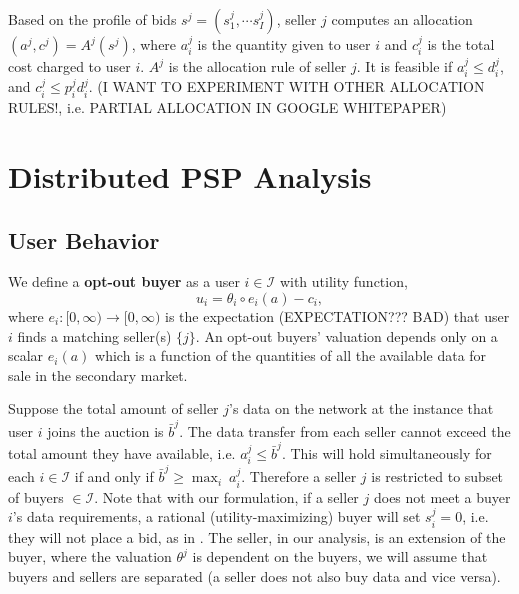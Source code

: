 \documentclass[12pt]{article}
\theoremstyle{definition}
\newcommand{\mcI}{\mathcal{I}}
\begin{document}
\begin{multicols}{2}
Based on the profile of bids $s^j = (s^j_1, \cdots s^j_I)$, seller $j$ computes
an allocation $(a^j, c^j) = A^j(s^j)$, where $a^j_i$ is the quantity given to
user $i$ and $c^j_i$ is the total cost charged to user $i$. $A^j$ is the
allocation rule of seller $j$. It is feasible if $a^j_i \le d_i^j$, and $c^j_i \le  p^j_i d_i^j$.
(I WANT TO EXPERIMENT WITH OTHER ALLOCATION RULES!, i.e. PARTIAL ALLOCATION IN
GOOGLE WHITEPAPER)

\section{Distributed PSP Analysis}
\subsection{User Behavior}

We define a \textbf{opt-out buyer} as a user $i\in\mcI$ with utility
function,
\begin{equation}\label{opt-utility}
    u_i = \theta_i \circ e_i(a) - c_i,
\end{equation}
where $e_i : [0, \infty) \rightarrow [0,\infty)$ is the expectation 
(EXPECTATION??? BAD) that user
$i$ finds a matching seller(s) $\lbrace j \rbrace$. An opt-out buyers' valuation
depends only on a scalar $e_i(a)$ which is a function of the
quantities of all the available data for sale in the secondary market. 

Suppose the total amount of seller $j$'s data on the network at the instance that
user $i$ joins the auction is $\bar{b}^j$. 
The data transfer from each seller cannot exceed the total amount they have available,
i.e. $a_i^j \le \bar{b}^j$. This will hold simultaneously for each $i \in
\mcI$ if and only if $\bar{b}^j \ge \max_i \ a_i^j$. Therefore a seller $j$ is
restricted to subset of buyers $\in\mcI$.
Note that with our formulation, if a seller $j$ does not meet a buyer $i$'s data requirements, a
rational (utility-maximizing) buyer will set $s_i^j = 0$, i.e. they will not
place a bid, as in \cite{zheng}. The seller, in our analysis, is an extension of the buyer, where the valuation
$\theta^j$ is dependent on the buyers, we will assume that buyers and sellers
are separated (a seller does not also buy data and vice versa). 


\end{multicols}
\end{document}
